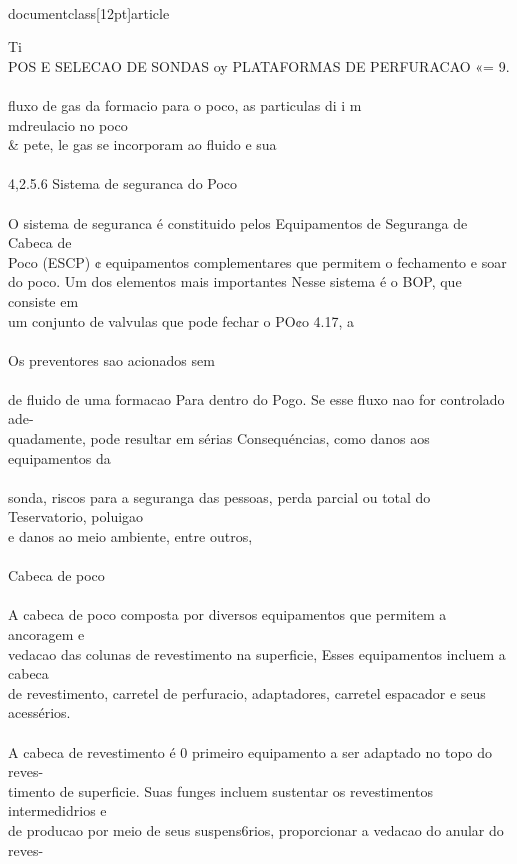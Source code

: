 \\documentclass[12pt]{article}
\begin{document}
Ti\\
POS E SELECAO DE SONDAS oy PLATAFORMAS DE PERFURACAO «= 9.\\
\\
fluxo de gas da formacio para o poco, as particulas di i m\\
mdreulacio no poco \\& pete, le gas se incorporam ao fluido e sua\\
\\
4,2.5.6 Sistema de seguranca do Poco\\
\\
O sistema de seguranca é constituido pelos Equipamentos de Seguranga de Cabeca de\\
Poco (ESCP) ¢ equipamentos complementares que permitem o fechamento e soar\\
do poco. Um dos elementos mais importantes Nesse sistema é o BOP, que consiste em\\
um conjunto de valvulas que pode fechar o PO¢o 4.17, a\\
\\
Os preventores sao acionados sem\\
\\
de fluido de uma formacao Para dentro do Pogo. Se esse fluxo nao for controlado ade-\\
quadamente, pode resultar em sérias Consequéncias, como danos aos equipamentos da\\
\\
sonda, riscos para a seguranga das pessoas, perda parcial ou total do Teservatorio, poluigao\\
e danos ao meio ambiente, entre outros,\\
\\
Cabeca de poco\\
\\
A cabeca de poco  composta por diversos equipamentos que permitem a ancoragem e\\
vedacao das colunas de revestimento na superficie, Esses equipamentos incluem a cabeca\\
de revestimento, carretel de perfuracio, adaptadores, carretel espacador e seus acessérios.\\
\\
A cabeca de revestimento é 0 primeiro equipamento a ser adaptado no topo do reves-\\
timento de superficie. Suas funges incluem sustentar os revestimentos intermedidrios e\\
de producao por meio de seus suspens6rios, proporcionar a vedacao do anular do reves-\\
\end{document}
